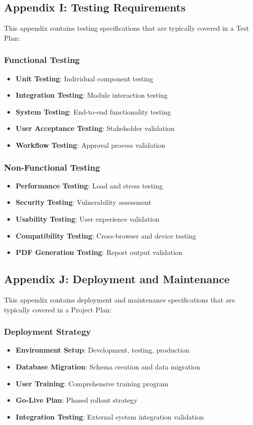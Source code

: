 \documentclass[12pt,a4paper]{article}
\begin{document}
\subsection{Appendix I: Testing Requirements}
This appendix contains testing specifications that are typically covered in a Test Plan:

\subsubsection{Functional Testing}
\begin{itemize}
    \item \textbf{Unit Testing}: Individual component testing
    \item \textbf{Integration Testing}: Module interaction testing
    \item \textbf{System Testing}: End-to-end functionality testing
    \item \textbf{User Acceptance Testing}: Stakeholder validation
    \item \textbf{Workflow Testing}: Approval process validation
\end{itemize}

\subsubsection{Non-Functional Testing}
\begin{itemize}
    \item \textbf{Performance Testing}: Load and stress testing
    \item \textbf{Security Testing}: Vulnerability assessment
    \item \textbf{Usability Testing}: User experience validation
    \item \textbf{Compatibility Testing}: Cross-browser and device testing
    \item \textbf{PDF Generation Testing}: Report output validation
\end{itemize}

\subsection{Appendix J: Deployment and Maintenance}
This appendix contains deployment and maintenance specifications that are typically covered in a Project Plan:

\subsubsection{Deployment Strategy}
\begin{itemize}
    \item \textbf{Environment Setup}: Development, testing, production
    \item \textbf{Database Migration}: Schema creation and data migration
    \item \textbf{User Training}: Comprehensive training program
    \item \textbf{Go-Live Plan}: Phased rollout strategy
    \item \textbf{Integration Testing}: External system integration validation
\end{itemize}
\end{document}
